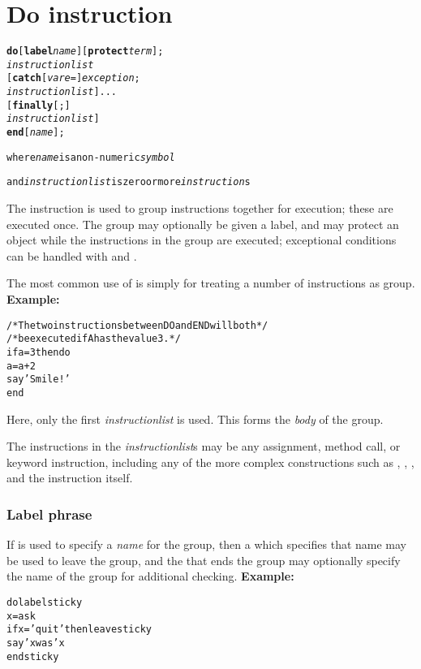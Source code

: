 \chapter{Do instruction}\label{refdo}
\index{,}
\index{,}
\index{,}
\begin{shaded}
\begin{alltt}
\textbf{do} [\textbf{label} \emph{name}] [\textbf{protect} \emph{term}];
        \emph{instructionlist}
    [\textbf{catch} [\emph{vare} =] \emph{exception};
        \emph{instructionlist}]...
    [\textbf{finally}[;]
        \emph{instructionlist}]
    \textbf{end} [\emph{name}];

where \emph{name} is a non-numeric \emph{symbol}

and \emph{instructionlist} is zero or more \emph{instruction}s
\end{alltt}
\end{shaded}
 The  instruction is used to group instructions together for
execution; these are executed once.
The group may optionally be given a label, and may protect an object
while the instructions in the group are executed; exceptional conditions
can be handled with  and .
 
The most common use of  is simply for treating a number of
instructions as group.
 \textbf{Example:}
\begin{alltt}
/* The two instructions between DO and END will both */
/* be executed if A has the value 3.                 */
if a=3 then do
  a=a+2
  say 'Smile!'
  end
\end{alltt}
Here, only the first \emph{instructionlist} is used.
This forms the \emph{body} of the group.
 
The instructions in the \emph{instructionlist}s may be any assignment,
method call, or keyword instruction, including any of the more complex
constructions such as , , , and
the  instruction itself.
\subsection{Label phrase}
 
If  is used to specify a \emph{name} for the group,
then a  which specifies that name may be used to leave the
group, and the  that ends the group may optionally specify
the name of the group for additional checking.
 \textbf{Example:}
\begin{alltt}
do label sticky
  x=ask
  if x='quit' then leave sticky
  say 'x was' x
  end sticky
\end{alltt}
